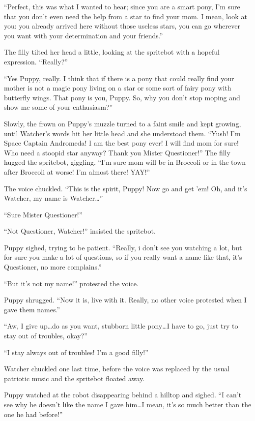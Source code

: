 ``Perfect, this was what I wanted to hear; since you are a smart pony, I'm sure that you don't even need the help from a star to find your mom. I mean, look at you: you already arrived here without those useless stars, you can go wherever you want with your determination and your friends.''

The filly tilted her head a little, looking at the spritebot with a hopeful expression. ``Really?''

``Yes Puppy, really. I think that if there is a pony that could really find your mother is not a magic pony living on a star or some sort of fairy pony with butterfly wings. That pony is you, Puppy. So, why you don't stop moping and show me some of your enthusiasm?''

Slowly, the frown on Puppy's muzzle turned to a faint smile and kept growing, until Watcher's words hit her little head and she understood them. ``Yush! I'm Space Captain Andromeda! I am the best pony ever! I will find mom for sure! Who need a stoopid star anyway? Thank you Mister Questioner!'' The filly hugged the spritebot, giggling. ``I'm sure mom will be in Broccoli or in the town after Broccoli at worse! I'm almost there! YAY!''

The voice chuckled. ``This is the spirit, Puppy! Now go and get 'em! Oh, and it's Watcher, my name is Watcher\dots''

``Sure Mister Questioner!''

``Not Questioner, Watcher!'' insisted the spritebot.

Puppy sighed, trying to be patient. ``Really, i don't see you watching a lot, but for sure you make a lot of questions, so if you really want a name like that, it's Questioner, no more complains.''

``But it's not my name!'' protested the voice.

Puppy shrugged. ``Now it is, live with it. Really, no other voice protested when I gave them names.''

``Aw, I give up\dots do as you want, stubborn little pony\dots I have to go, just try to stay out of troubles, okay?''

``I stay always out of troubles! I'm a good filly!''

Watcher chuckled one last time, before the voice was replaced by the usual patriotic music and the spritebot floated away.

Puppy watched at the robot disappearing behind a hilltop and sighed. ``I can't see why he doesn't like the name I gave him\dots I mean, it's so much better than the one he had before!''


